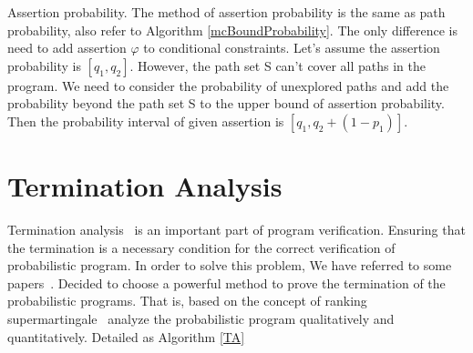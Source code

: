 Assertion probability. The method of assertion probability is the same as path probability, also refer to Algorithm \ref{mcBoundProbability}. The only difference is need to add assertion $\varphi$ to conditional constraints. Let's assume the assertion probability is $[q_1,q_2]$. However, the path set S can't cover all paths in the program. We need to consider the probability of unexplored paths and add the probability beyond the path set S to the upper bound of assertion probability. Then the probability interval of given assertion is $[q_1,q_2+(1-p_1)]$.

\section{Termination Analysis}
Termination analysis~\cite{Codish1999Semantic} is an important part of program verification. Ensuring that the termination is a necessary condition for the correct verification of probabilistic program. In order to solve this problem, We have referred to some papers~\cite{kris2016termination,
	cha2015algorithmic, Hermanns2013Probabilistic}. Decided to choose a powerful method to prove the termination of the probabilistic programs. That is, based on the concept of ranking supermartingale~\cite{Chakarov2013Martingales} analyze the probabilistic program qualitatively and quantitatively. Detailed as Algorithm \ref{TA}


